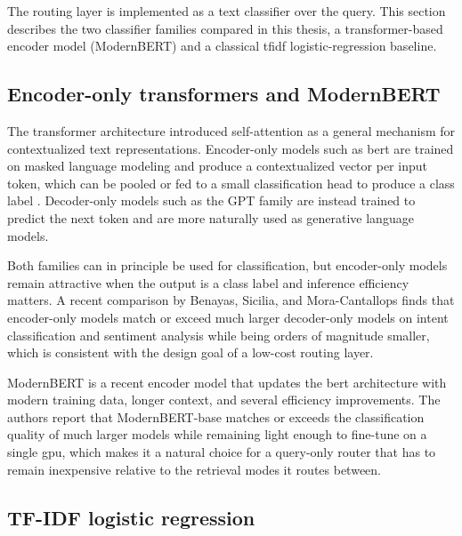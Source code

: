 \documentclass[english, bibtex]{kththesis}               %
\numberwithin{listing}{chapter}
\begin{document}
The routing layer is implemented as a text classifier over the query. This section describes the two classifier families compared in this thesis, a transformer-based encoder model (ModernBERT) and a classical \gls{tfidf} logistic-regression baseline.

\subsection{Encoder-only transformers and ModernBERT}
\label{sec:backgroundEncoders}

The transformer architecture \cite{vaswani2017attention} introduced self-attention as a general mechanism for contextualized text representations. Encoder-only models such as \gls{bert} are trained on masked language modeling and produce a contextualized vector per input token, which can be pooled or fed to a small classification head to produce a class label \cite{devlin2019bert}. Decoder-only models such as the GPT family are instead trained to predict the next token and are more naturally used as generative language models.

Both families can in principle be used for classification, but encoder-only models remain attractive when the output is a class label and inference efficiency matters. A recent comparison by Benayas, Sicilia, and Mora-Cantallops \cite{benayas2024encoder} finds that encoder-only models match or exceed much larger decoder-only models on intent classification and sentiment analysis while being orders of magnitude smaller, which is consistent with the design goal of a low-cost routing layer.

ModernBERT \cite{warner2024modernbert} is a recent encoder model that updates the \gls{bert} architecture with modern training data, longer context, and several efficiency improvements. The authors report that ModernBERT-base matches or exceeds the classification quality of much larger models while remaining light enough to fine-tune on a single \gls{gpu}, which makes it a natural choice for a query-only router that has to remain inexpensive relative to the retrieval modes it routes between.

\subsection{TF-IDF logistic regression}
\label{sec:backgroundTfidf}
\end{document}
